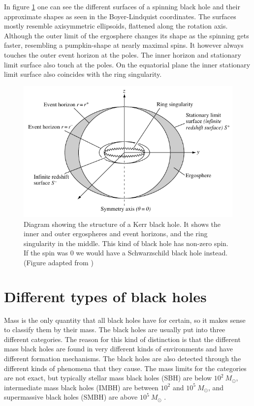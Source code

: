 \documentclass[english, oneside]{HYgradu}
\begin{document}
In figure \ref{fig:KerrHole} one can see the different surfaces of a spinning black hole and their approximate shapes as seen in the Boyer-Lindquist coordinates. The surfaces mostly resemble axisymmetric ellipsoids, flattened along the rotation axis. Although the outer limit of the ergosphere changes its shape as the spinning gets faster, resembling a pumpkin-shape at nearly maximal spins. It however always touches the outer event horizon at the poles. The inner horizon and stationary limit surface also touch at the poles. On the equatorial plane the inner stationary limit surface also coincides with the ring singularity.

\begin{figure}
\centering
\includegraphics[width=\textwidth]{../images/kerrhole.pdf}
\caption{Diagram showing the structure of a Kerr black hole. It shows the inner and outer ergospheres and event horizons, and the ring singularity in the middle. This kind of black hole has non-zero spin. If the spin was 0 we would have a Schwarzschild black hole instead.
(Figure adapted from \citealt{grintro})}
\label{fig:KerrHole}
\end{figure}




\newpage
\section{Different types of black holes}

Mass is the only quantity that all black holes have for certain, so it makes sense to classify them by their mass. The black holes are usually put into three different categories. The reason for this kind of distinction is that the different mass black holes are found in very different kinds of environments and have different formation mechanisms. The black holes are also detected through the different kinds of phenomena that they cause.
The mass limits for the categories are not exact, but typically stellar mass black holes (SBH) are below $10^2 \ M_\odot$, intermediate mass black holes (IMBH) are between $10^2$ and $10^5 \ M_\odot$, and supermassive black holes (SMBH) are above $10^5 \ M_\odot$ \citep{bhphysics}.
\end{document}
